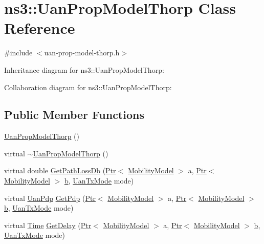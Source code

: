 \hypertarget{classns3_1_1UanPropModelThorp}{}\section{ns3\+:\+:Uan\+Prop\+Model\+Thorp Class Reference}
\label{classns3_1_1UanPropModelThorp}


{\ttfamily \#include $<$uan-\/prop-\/model-\/thorp.\+h$>$}



Inheritance diagram for ns3\+:\+:Uan\+Prop\+Model\+Thorp\+:


Collaboration diagram for ns3\+:\+:Uan\+Prop\+Model\+Thorp\+:
\subsection*{Public Member Functions}
\begin{DoxyCompactItemize}
\item 
\hyperlink{classns3_1_1UanPropModelThorp_a5103e37de55cf8d8832b267f70dda5a4}{Uan\+Prop\+Model\+Thorp} ()
\item 
virtual \hyperlink{classns3_1_1UanPropModelThorp_a46b3a8b53f0ba8bd0eeb3b789827e3cd}{$\sim$\+Uan\+Prop\+Model\+Thorp} ()
\item 
virtual double \hyperlink{classns3_1_1UanPropModelThorp_a5234a83f4289907a57afa9246e4e0f8b}{Get\+Path\+Loss\+Db} (\hyperlink{classns3_1_1Ptr}{Ptr}$<$ \hyperlink{classns3_1_1MobilityModel}{Mobility\+Model} $>$ a, \hyperlink{classns3_1_1Ptr}{Ptr}$<$ \hyperlink{classns3_1_1MobilityModel}{Mobility\+Model} $>$ \hyperlink{lte__pathloss_8m_a21ad0bd836b90d08f4cf640b4c298e7c}{b}, \hyperlink{classns3_1_1UanTxMode}{Uan\+Tx\+Mode} mode)
\item 
virtual \hyperlink{classns3_1_1UanPdp}{Uan\+Pdp} \hyperlink{classns3_1_1UanPropModelThorp_a29c43fca215d7825e6805838e8008a04}{Get\+Pdp} (\hyperlink{classns3_1_1Ptr}{Ptr}$<$ \hyperlink{classns3_1_1MobilityModel}{Mobility\+Model} $>$ a, \hyperlink{classns3_1_1Ptr}{Ptr}$<$ \hyperlink{classns3_1_1MobilityModel}{Mobility\+Model} $>$ \hyperlink{lte__pathloss_8m_a21ad0bd836b90d08f4cf640b4c298e7c}{b}, \hyperlink{classns3_1_1UanTxMode}{Uan\+Tx\+Mode} mode)
\item 
virtual \hyperlink{classns3_1_1Time}{Time} \hyperlink{classns3_1_1UanPropModelThorp_a6b89d0d9e637546e3af0b324c42fc4e0}{Get\+Delay} (\hyperlink{classns3_1_1Ptr}{Ptr}$<$ \hyperlink{classns3_1_1MobilityModel}{Mobility\+Model} $>$ a, \hyperlink{classns3_1_1Ptr}{Ptr}$<$ \hyperlink{classns3_1_1MobilityModel}{Mobility\+Model} $>$ \hyperlink{lte__pathloss_8m_a21ad0bd836b90d08f4cf640b4c298e7c}{b}, \hyperlink{classns3_1_1UanTxMode}{Uan\+Tx\+Mode} mode)
\end{DoxyCompactItemize}
